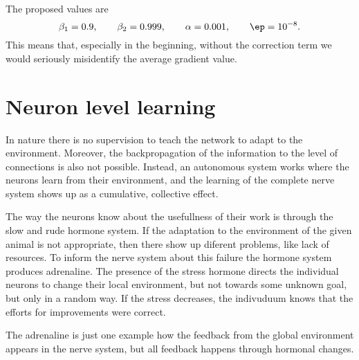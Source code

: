\documentclass[10pt,a4paper]{article}
\begin{document}
The proposed values are
\begin{equation}
  \beta_1 = 0.9,\qquad \beta_2=0.999,\qquad \alpha=0.001,\qquad \ep=10^{-8}.
\end{equation}
This means that, especially in the beginning, without the correction term we would seriously misidentify the average gradient value.

\section{Neuron level learning}

In nature there is no supervision to teach the network to adapt to the environment. Moreover, the backpropagation of the information to the level of connections is also not possible. Instead, an autonomous system works where the neurons learn from their environment, and the learning of the complete nerve system shows up as a cumulative, collective effect.

The way the neurons know about the usefullness of their work is through the slow and rude hormone system. If the adaptation to the environment of the given animal is not appropriate, then there show up diferent problems, like lack of resources. To inform the nerve system about this failure the hormone system produces adrenaline. The presence of the stress hormone directs the individual neurons to change their local environment, but not towards some unknown goal, but only in a random way. If the stress decreases, the indivuduum knows that the efforts for improvements were correct.

The adrenaline is just one example how the feedback from the global environment appears in the nerve system, but all feedback happens through hormonal changes.
\end{document}
